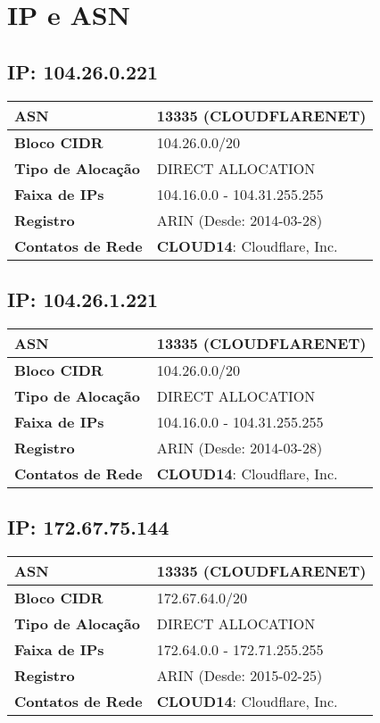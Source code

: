 \section{IP e ASN}

    \subsection{IP: 104.26.0.221}
    \begin{tabular}{|l|l|}
    \hline
    \textbf{ASN} & 13335 (CLOUDFLARENET) \\ \hline
    \textbf{Bloco CIDR} & 104.26.0.0/20 \\ \hline
    \textbf{Tipo de Alocação} & DIRECT ALLOCATION \\ \hline
    \textbf{Faixa de IPs} & 104.16.0.0 - 104.31.255.255 \\ \hline
    \textbf{Registro} & ARIN (Desde: 2014-03-28) \\ \hline
        
\textbf{Contatos de Rede} & \textbf{CLOUD14}: Cloudflare, Inc. 
\\ \hline
\end{tabular}


    \subsection{IP: 104.26.1.221}
    \begin{tabular}{|l|l|}
    \hline
    \textbf{ASN} & 13335 (CLOUDFLARENET) \\ \hline
    \textbf{Bloco CIDR} & 104.26.0.0/20 \\ \hline
    \textbf{Tipo de Alocação} & DIRECT ALLOCATION \\ \hline
    \textbf{Faixa de IPs} & 104.16.0.0 - 104.31.255.255 \\ \hline
    \textbf{Registro} & ARIN (Desde: 2014-03-28) \\ \hline
        
\textbf{Contatos de Rede} & \textbf{CLOUD14}: Cloudflare, Inc. 
\\ \hline
\end{tabular}


    \subsection{IP: 172.67.75.144}
    \begin{tabular}{|l|l|}
    \hline
    \textbf{ASN} & 13335 (CLOUDFLARENET) \\ \hline
    \textbf{Bloco CIDR} & 172.67.64.0/20 \\ \hline
    \textbf{Tipo de Alocação} & DIRECT ALLOCATION \\ \hline
    \textbf{Faixa de IPs} & 172.64.0.0 - 172.71.255.255 \\ \hline
    \textbf{Registro} & ARIN (Desde: 2015-02-25) \\ \hline
        
\textbf{Contatos de Rede} & \textbf{CLOUD14}: Cloudflare, Inc. 
\\ \hline
\end{tabular}


